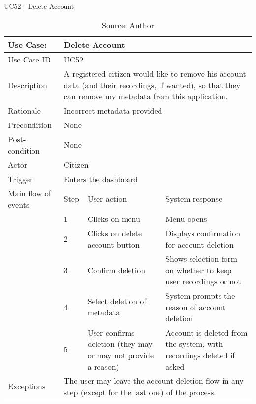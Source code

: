 \begin{table}[ht]
\centering
\caption{UC52 - Delete Account}
\label{uc:52}
\begin{tabular}{|p{3cm}|p{1cm}|p{5cm}|p{5cm}|}
\hline
Use Case:       & \multicolumn{3}{p{11cm}|}{Delete Account} \\ \hline
Use Case ID     & \multicolumn{3}{p{11cm}|}{UC52} \\ \hline
Description     & \multicolumn{3}{p{11cm}|}{A registered citizen would like to remove his account data (and their recordings, if wanted), so that they can remove my metadata from this application.} \\ \hline
Rationale       & \multicolumn{3}{p{11cm}|}{Incorrect metadata provided} \\ \hline
Precondition    & \multicolumn{3}{p{11cm}|}{None} \\ \hline
Post-condition  & \multicolumn{3}{p{11cm}|}{None} \\ \hline
Actor           & \multicolumn{3}{p{11cm}|}{Citizen} \\ \hline
Trigger         & \multicolumn{3}{p{11cm}|}{Enters the dashboard} \\ \hline
Main flow of events & Step  & User action & System response \\ \hline
                    & 1     & Clicks on menu & Menu opens \\ \hline
                    & 2     & Clicks on delete account button & Displays confirmation for account deletion \\ \hline
                    & 3     & Confirm deletion & Shows selection form on whether to keep user recordings or not\\ \hline
                    & 4     & Select deletion of metadata & System prompts the reason of account deletion \\ \hline
                    & 5     & User confirms deletion (they may or may not provide a reason) & Account is deleted from the system, with recordings deleted if asked \\ \hline
Exceptions      & \multicolumn{3}{p{11cm}|}{The user may leave the account deletion flow in any step (except for the last one) of the process.} \\ \hline
\end{tabular}
\caption*{Source: Author}
\end{table}
